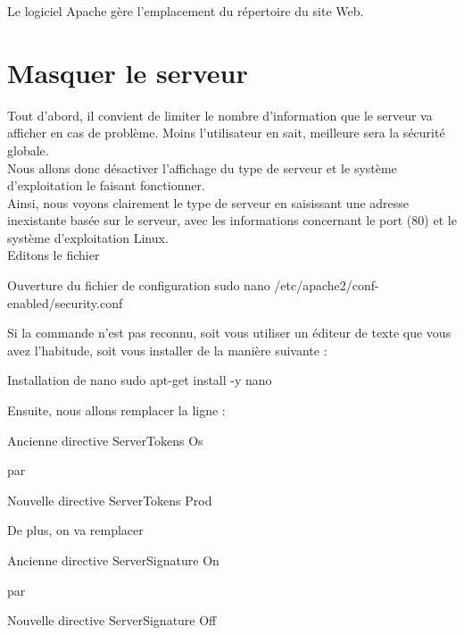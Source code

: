 Le logiciel Apache gère l’emplacement du répertoire du site Web. \\


\section{Masquer le serveur}

Tout d’abord, il convient de limiter le nombre d’information que le serveur va afficher en cas de problème. Moins l’utilisateur en sait, meilleure sera la sécurité globale.\\

Nous allons donc désactiver l’affichage du type de serveur et le système d’exploitation le faisant fonctionner.\\

Ainsi, nous voyons clairement le type de serveur en saisissant une adresse inexistante basée sur le serveur, avec les informations concernant le port (80) et le système d’exploitation Linux. \\

Editons le fichier 

\begin{Bash}{Ouverture du fichier de configuration}
sudo nano /etc/apache2/conf-enabled/security.conf 
\end{Bash}

Si la commande  n'est pas reconnu, soit vous utiliser un éditeur de texte que vous avez l'habitude, soit vous installer  de la manière suivante : 

\begin{Bash}{Installation de nano}
sudo apt-get install -y nano
\end{Bash}


Ensuite, nous allons remplacer la ligne :
\begin{Bash}{Ancienne directive}
ServerTokens Os 
\end{Bash}
par
\begin{Bash}{Nouvelle directive}
ServerTokens Prod 
\end{Bash}

De plus, on va remplacer 

\begin{Bash}{Ancienne directive}
ServerSignature On
\end{Bash}
par
\begin{Bash}{Nouvelle directive}
ServerSignature Off
\end{Bash}



